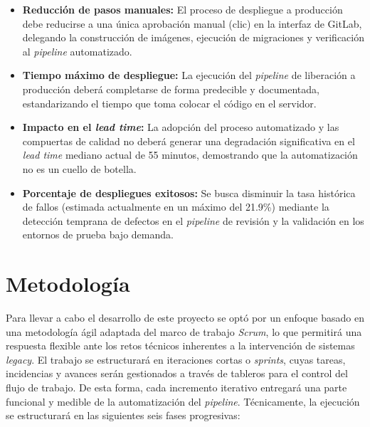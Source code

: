 \begin{itemize}
\item \textbf{Reducción de pasos manuales:} El proceso de despliegue a producción debe reducirse a una
única aprobación manual (clic) en la interfaz de GitLab, delegando la construcción de imágenes,
ejecución de migraciones y verificación al \emph{pipeline} automatizado.

\item \textbf{Tiempo máximo de despliegue:} La ejecución del \emph{pipeline} de liberación a producción
deberá completarse de forma predecible y documentada, estandarizando el tiempo que toma colocar
el código en el servidor.

\item \textbf{Impacto en el \emph{lead time}:} La adopción del proceso automatizado y las compuertas
de calidad no deberá generar una degradación significativa en el \emph{lead time} mediano actual de 55 minutos,
demostrando que la automatización no es un cuello de botella.

\item \textbf{Porcentaje de despliegues exitosos:} Se busca disminuir la tasa histórica de fallos
(estimada actualmente en un máximo del 21.9\%) mediante la detección temprana de defectos en el \emph{pipeline}
de revisión y la validación en los entornos de prueba bajo demanda.
\end{itemize}

\section{Metodología}
Para llevar a cabo el desarrollo de este proyecto se optó por un enfoque basado en una metodología ágil adaptada
del marco de trabajo \emph{Scrum}, lo que permitirá una respuesta flexible ante los retos técnicos
inherentes a la intervención de sistemas \emph{legacy}. El trabajo se estructurará en iteraciones cortas
o \emph{sprints}, cuyas tareas, incidencias y avances serán gestionados a través de tableros para el control
del flujo de trabajo. De esta forma, cada incremento iterativo entregará una parte funcional y
medible de la automatización del \emph{pipeline}. Técnicamente, la ejecución se estructurará
en las siguientes seis fases progresivas:

